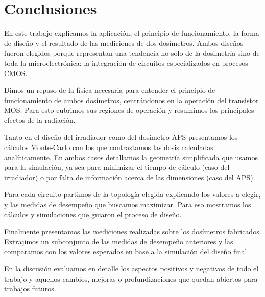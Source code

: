 \section{Conclusiones}
En este trabajo explicamos la aplicación, el principio de funcionamiento, la
forma de diseño y el resultado de las mediciones de dos dosímetros.
Ambos diseños fueron elegidos porque representan una tendencia no sólo de
la dosimetría sino de toda la microelectrónica:
la integración de circuitos especializados en procesos CMOS.

Dimos un repaso de la física necesaria para entender el principio de
funcionamiento de ambos dosímetros, centrándonos en la operación del transistor
MOS. Para esto cubrimos sus regiones de operación y resumimos los principales
efectos de la radiación.

Tanto en el diseño del irradiador como del dosímetro APS presentamos los
cálculos Monte-Carlo con los que contrastamos las dosis calculadas
analíticamente. En ambos casos detallamos la geometría simplificada que usamos
para la simulación, ya sea para minimizar el tiempo de cálculo (caso del
irradiador) o por falta de información acerca de las dimensiones (caso del
APS).

Para cada circuito partimos de la topología elegida explicando los valores a
elegir, y las medidas de desempeño que buscamos maximizar. Para eso mostramos
los cálculos y simulaciones que guiaron el proceso de diseño.

Finalmente presentamos las mediciones realizadas sobre los dosímetros
fabricados. Extrajimos un subconjunto de las medidas de desempeño anteriores y
las comparamos con los valores esperados en base a la simulación del diseño
final.

En la discusión evaluamos en detalle los aspectos positivos y negativos de todo
el trabajo y aquellos cambios, mejoras o profundizaciones que quedan abiertos
para trabajos futuros.
